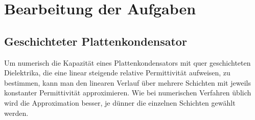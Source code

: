 \chapter{Bearbeitung der Aufgaben}
\section{Geschichteter Plattenkondensator}

Um numerisch die Kapazität eines Plattenkondensators mit quer geschichteten Dielektrika, die eine linear steigende relative Permittivität aufweisen, zu bestimmen, kann man den linearen Verlauf über mehrere Schichten mit jeweils konstanter Permittivität approximieren. Wie bei numerischen Verfahren üblich wird die Approximation besser, je dünner die einzelnen Schichten gewählt werden.\\
